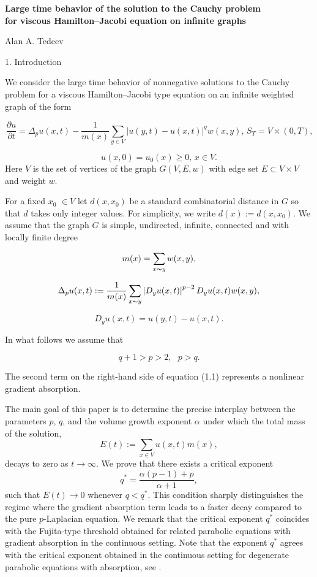 \documentclass{article}
\begin{document}
	
	
	\begin{center}
		\textbf{Large time behavior of the solution to the Cauchy problem\\
			for viscous Hamilton--Jacobi equation on infinite graphs}
		
		\medskip
		Alan A. Tedeev
	\end{center}
	
	1. Introduction
	
	We consider the large time behavior of nonnegative solutions to the Cauchy problem for a viscous Hamilton--Jacobi type equation on an infinite weighted graph of the form
	
	\begin{equation}
		\frac{\partial u}{\partial t}=\Delta _{p}u(x,t)-\frac{1}{m(x)}\sum\limits_{y\in
			V}\left\vert u(y,t)-u(x,t)\right\vert ^{q}w(x,y)\text{, }S_{T}=V\times (0,T)
		\text{,}  \tag{1.1}
	\end{equation}
	
	\begin{equation}
		u(x,0)=u_{0}(x)\geq 0\text{, }x\in V\text{.}  \tag{1.2}
	\end{equation}
	Here $V$ is the set of vertices of the graph $G(V,E,w)$ with edge set $
	E\subset V\times V$ and weight $w$.
	
	For a fixed $x_{0}$ $\in V$ let $d(x,x_{0})$ be a standard combinatorial distance in $G$ so that $d$ takes only integer values. For simplicity, we write $d(x):=d(x,x_{0})$. We assume that the graph $G$ is simple, undirected,
	infinite, connected and with locally finite degree
	
	\[
	m(x)=\sum\limits_{x\thicksim y}w(x,y),
	\]
	
	\[
	\Delta _{p}u(x,t):=\frac{1}{m(x)}\sum\limits_{x\thicksim y}\left\vert
	D_{y}u(x,t)\right\vert ^{p-2}D_{y}u(x,t)w(x,y),
	\]
	
	\[
	D_{y}u(x,t)=u(y,t)-u(x,t).
	\]
	
	In what follows we assume that
	
	\[
	q+1>p>2,\text{ }p>q.  \tag{1.3}
	\]
	
	
	The second term on the right-hand side of equation (1.1) represents a nonlinear gradient absorption. 
	
	The main goal of this paper is to determine the precise interplay between the parameters $p$, $q$, and the volume growth exponent $\alpha$ under which the total mass of the solution,
	\[
	E(t):=\sum_{x\in V}u(x,t)m(x),
	\]
	decays to zero as $t\to\infty$. We prove that there exists a critical exponent
	\[
	q^{*}=\frac{\alpha(p-1)+p}{\alpha+1},
	\]
	such that $E(t)\to 0$ whenever $q < q^*$. This condition sharply distinguishes the regime where the gradient absorption term leads to a faster decay compared to the pure $p$-Laplacian equation. We remark that the critical exponent $q^{*}$ coincides with the Fujita-type threshold obtained for related parabolic equations with gradient absorption in the continuous setting. Note that the exponent $q^*$ agrees with the critical exponent obtained in the continuous setting for degenerate parabolic equations with absorption, see \cite{andreucci2004}.
	
\end{document}
